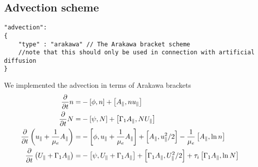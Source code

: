 \subsection{Advection scheme}
\begin{verbatim}
"advection":
{
    "type" : "arakawa" // The Arakawa bracket scheme
    //note that this should only be used in connection with artificial diffusion
}
\end{verbatim}
We implemented the advection in terms of Arakawa brackets
\begin{align}
\frac{\partial}{\partial t} \ne =&
 - \left[\phi, \ne\right]
+ \left[\Apar,\ne \ue  \right]
\\
\label{firstgyromom}
\frac{\partial}{\partial t} \Ni =&
 - \left[\psi, \Ni\right]
+ \left[\Gamma_1 \Apar ,\Ni \Ui  \right]
 \\
\frac{\partial}{\partial t} \left( \ue+ \frac{1}{\mu_e} \Apar \right) =&
      -  \left[ \phi, \ue+ \frac{1}{\mu_e} \Apar  \right]%
    +   \left[\Apar,\ue^2/2   \right]%
      - \frac{1}{\mu_e}  \left[\Apar,\ln{\ne}   \right]
      \\
      \frac{\partial}{\partial t} \left( \Ui+ \Gamma_1 \Apar  \right) =&
      -  \left[ \psi, \Ui+ \Gamma_1 \Apar  \right]%
     +   \left[\Gamma_1 \Apar,\Ui^2/2   \right]%
      + \tau_i  \left[\Gamma_1 \Apar,\ln{\Ni}   \right]
\end{align}

